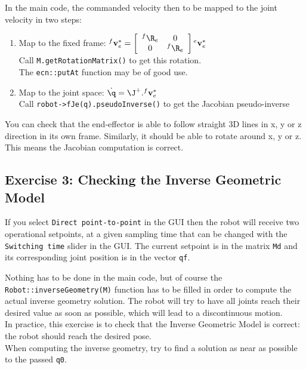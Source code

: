 \documentclass{ecnreport}
\begin{document}
  
  In the main code, the commanded velocity then to be mapped to the joint velocity in two steps:
  \begin{enumerate}
    \item Map to the fixed frame: ${}^f\mathbf{v}_e^* = \left[\begin{array}{cc}{}^f\R_e & 0 \\ 0 & {}^f\R_e\end{array}\right]{}^e\mathbf{v}_e^*$\\
    Call \texttt{M.getRotationMatrix()} to get this rotation.\\
    The \texttt{ecn::putAt} function may be of good use.
    \item Map to the joint space: $\dot\q = \J^+.{}^f\mathbf{v}_e^*$\\
    Call \texttt{robot->fJe(q).pseudoInverse()} to get the Jacobian pseudo-inverse
  \end{enumerate}
  You can check that the end-effector is able to follow straight 3D lines in x, y or z direction in its own frame.
  Similarly, it should be able to rotate around x, y or z. This means the Jacobian computation is correct.
  
  \newpage
  \subsection*{Exercise 3: Checking the Inverse Geometric Model}
  
  If you select \texttt{Direct point-to-point} in the GUI then the robot will receive two operational setpoints, at a given sampling time that can be changed with the \texttt{Switching time} slider in the GUI. The current setpoint is in the matrix \texttt{Md} and its corresponding joint position is in the vector \texttt{qf}. 
  
  Nothing has to be done in the main code, but of course the \texttt{Robot::inverseGeometry(M)} function has to be filled in order to compute the actual inverse geometry solution. The robot will try to have all joints reach their desired value as soon as possible, which will lead to a discontinuous motion.\\
  
  In practice, this exercise is to check that the Inverse Geometric Model is correct: the robot should reach the desired pose.\\
  
  When computing the inverse geometry, try to find a solution as near as possible to the passed \texttt{q0}.\\
  
\end{document}

